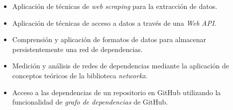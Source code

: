\begin{itemize}
  \item Aplicación de técnicas de \textit{web scraping} para la extracción de datos.
  
  \item Aplicación de técnicas de acceso a datos a través de una \textit{Web API}.
  
  \item Comprensión y aplicación de formatos de datos para almacenar persistentemente una red de dependencias.
  
  \item Medición y análisis de redes de dependencias mediante la aplicación de conceptos teóricos de la biblioteca \textit{networkx}.
  
  \item Acceso a las dependencias de un repositorio en GitHub utilizando la funcionalidad de \textit{grafo de dependencias} de GitHub.
\end{itemize}